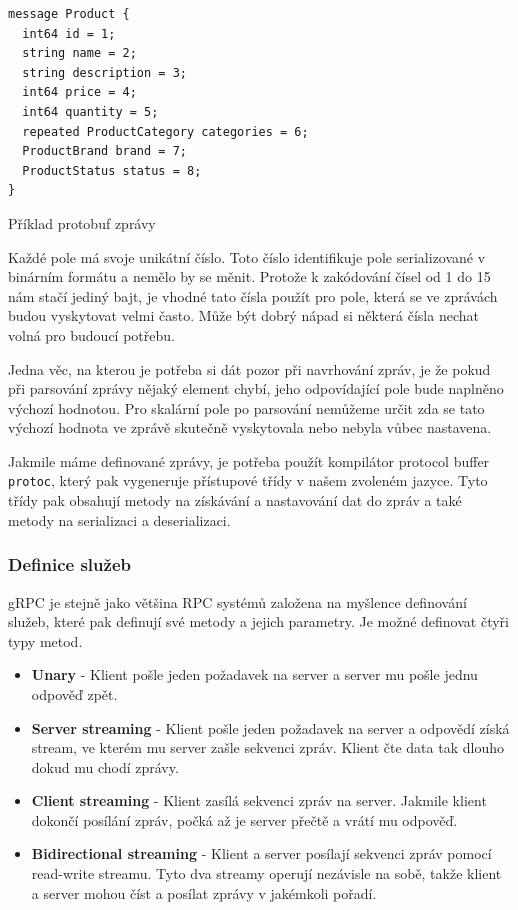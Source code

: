 \documentclass[thesis=M,czech]{FITthesis}[2019/12/23]
\begin{document}
\begin{listing}[H]
\begin{verbatim}
message Product {
  int64 id = 1;
  string name = 2;
  string description = 3;
  int64 price = 4;
  int64 quantity = 5;
  repeated ProductCategory categories = 6;
  ProductBrand brand = 7;
  ProductStatus status = 8;
}
\end{verbatim}
\caption{Příklad protobuf zprávy}
\label{lst:protobuf_example}
\end{listing}

Každé pole má svoje unikátní číslo. Toto číslo identifikuje pole serializované v binárním formátu a nemělo by se měnit. Protože k zakódování čísel od 1 do 15 nám stačí jediný bajt, je vhodné tato čísla použít pro pole, která se ve zprávách budou vyskytovat velmi často. Může být dobrý nápad si některá čísla nechat volná pro budoucí potřebu.

Jedna věc, na kterou je potřeba si dát pozor při navrhování zpráv, je že pokud při parsování zprávy nějaký element chybí, jeho odpovídající pole bude naplněno výchozí hodnotou. Pro skalární pole po parsování nemůžeme určit zda se tato výchozí hodnota ve zprávě skutečně vyskytovala nebo nebyla vůbec nastavena. 

Jakmile máme definované zprávy, je potřeba použít kompilátor protocol buffer \texttt{protoc}, který pak vygeneruje přístupové třídy v našem zvoleném jazyce. Tyto třídy pak obsahují metody na získávání a nastavování dat do zpráv a také metody na serializaci a deserializaci.

\subsubsection*{Definice služeb}
gRPC je stejně jako většina RPC systémů založena na myšlence definování služeb, které pak definují své metody a jejich parametry. Je možné definovat čtyři typy metod.

\begin{itemize}
    \item \textbf{Unary} - Klient pošle jeden požadavek na server a server mu pošle jednu odpověď zpět.
    \item \textbf{Server streaming} - Klient pošle jeden požadavek na server a odpovědí získá stream, ve kterém mu server zašle sekvenci zpráv. Klient čte data tak dlouho dokud mu chodí zprávy.
    \item \textbf{Client streaming} - Klient zasílá sekvenci zpráv na server. Jakmile klient dokončí posílání zpráv, počká až je server přečtě a vrátí mu odpověď.
    \item \textbf{Bidirectional streaming} - Klient a server posílají sekvenci zpráv pomocí read-write streamu. Tyto dva streamy operují nezávisle na sobě, takže klient a server mohou číst a posílat zprávy v jakémkoli pořadí.
\end{itemize}
\end{document}
